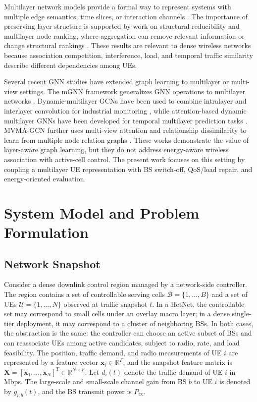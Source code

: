 \documentclass[journal]{IEEEtran}
\begin{document}
Multilayer network models provide a formal way to represent systems with
multiple edge semantics, time slices, or interaction channels
\cite{kivela2014multilayer,dedomenico2013mathematical,boccaletti2014structure}.
The importance of preserving layer structure is supported by work on structural
reducibility and multilayer node ranking, where aggregation can remove relevant
information or change structural rankings
\cite{dedomenico2015reducibility,dedomenico2015versatile}. These results are
relevant to dense wireless networks because association competition,
interference, load, and temporal traffic similarity describe different
dependencies among UEs.

Several recent GNN studies have extended graph learning to multilayer or
multi-view settings. The mGNN framework generalizes GNN operations to
multilayer networks \cite{grassia2021mgnn}. Dynamic-multilayer GCNs have been
used to combine intralayer and interlayer convolution for industrial monitoring
\cite{zhang2023dynamic}, while attention-based dynamic multilayer GNNs have
been developed for temporal multilayer prediction tasks
\cite{zandi2025attention}. MVMA-GCN further uses multi-view attention and
relationship dissimilarity to learn from multiple node-relation graphs
\cite{zhang2023mvma}. These works demonstrate the value of layer-aware graph
learning, but they do not address energy-aware wireless association with
active-cell control. The present work focuses on this setting by coupling a
multilayer UE representation with BS switch-off, QoS/load repair, and
energy-oriented evaluation.

\section{System Model and Problem Formulation}
\subsection{Network Snapshot}
Consider a dense downlink control region managed by a network-side controller.
The region contains a set of controllable serving cells
$\mathcal{B}=\{1,\ldots,B\}$ and a set of UEs
$\mathcal{U}=\{1,\ldots,N\}$ observed at traffic snapshot $t$. In a HetNet, the
controllable set may correspond to small cells under an overlay macro layer; in
a dense single-tier deployment, it may correspond to a cluster of neighboring
BSs. In both cases, the abstraction is the same: the controller can choose an
active subset of BSs and can reassociate UEs among active candidates, subject to
radio, rate, and load feasibility. The position, traffic demand, and radio
measurements of UE $i$ are represented by a feature vector
$\mathbf{x}_i\in\mathbb{R}^{F}$, and the snapshot feature matrix is
$\mathbf{X}=[\mathbf{x}_1,\ldots,\mathbf{x}_N]^{T}\in\mathbb{R}^{N\times F}$.
Let $d_i(t)$ denote the traffic demand of UE $i$ in Mbps. The large-scale and
small-scale channel gain from BS $b$ to UE $i$ is denoted by $g_{i,b}(t)$, and
the BS transmit power is $P_{\mathrm{tx}}$.
\end{document}
